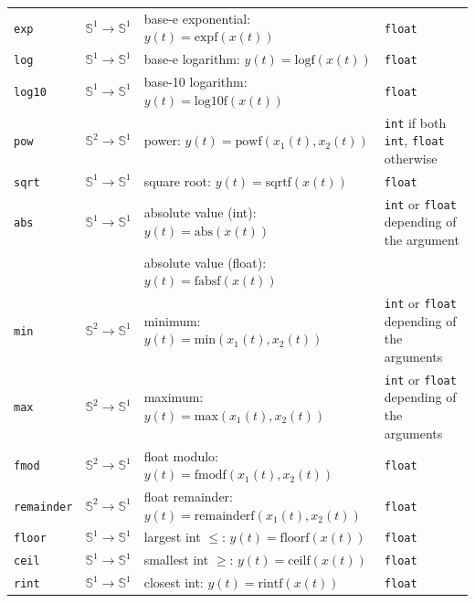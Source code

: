 \begin{tabular}{|l|l|l|l|}
\texttt{exp} & $\mathbb{S}^{1}\rightarrow\mathbb{S}^{1}$ & base-e exponential: $y(t)=\mathrm{expf}(x(t))$  & \texttt{float}\\
\texttt{log} & $\mathbb{S}^{1}\rightarrow\mathbb{S}^{1}$ & base-e logarithm: $y(t)=\mathrm{logf}(x(t))$  & \texttt{float}\\
\texttt{log10} & $\mathbb{S}^{1}\rightarrow\mathbb{S}^{1}$ & base-10 logarithm: $y(t)=\mathrm{log10f}(x(t))$ & \texttt{float} \\
\texttt{pow} & $\mathbb{S}^{2}\rightarrow\mathbb{S}^{1}$ & power: $y(t)=\mathrm{powf}(x_{1}(t),x_{2}(t))$ & \texttt{int} if both \texttt{int}, \texttt{float} otherwise \\
\texttt{sqrt} & $\mathbb{S}^{1}\rightarrow\mathbb{S}^{1}$ & square root: $y(t)=\mathrm{sqrtf}(x(t))$  & \texttt{float}\\
\texttt{abs} & $\mathbb{S}^{1}\rightarrow\mathbb{S}^{1}$ & absolute value (int): $y(t)=\mathrm{abs}(x(t))$ & \texttt{int} or \texttt{float} depending of the argument \\
			&											 & absolute value (float): $y(t)=\mathrm{fabsf}(x(t))$ \\
\texttt{min} & $\mathbb{S}^{2}\rightarrow\mathbb{S}^{1}$ & minimum: $y(t)=\mathrm{min}(x_{1}(t),x_{2}(t))$  &\texttt{int} or \texttt{float} depending of the arguments \\
\texttt{max} & $\mathbb{S}^{2}\rightarrow\mathbb{S}^{1}$ & maximum: $y(t)=\mathrm{max}(x_{1}(t),x_{2}(t))$  &\texttt{int} or \texttt{float} depending of the arguments \\
\texttt{fmod} & $\mathbb{S}^{2}\rightarrow\mathbb{S}^{1}$ & float modulo: $y(t)=\mathrm{fmodf}(x_{1}(t),x_{2}(t))$ & \texttt{float} \\
\texttt{remainder} & $\mathbb{S}^{2}\rightarrow\mathbb{S}^{1}$ & float remainder: $y(t)=\mathrm{remainderf}(x_{1}(t),x_{2}(t))$ & \texttt{float} \\

\texttt{floor} & $\mathbb{S}^{1}\rightarrow\mathbb{S}^{1}$ & largest int $\leq$: $y(t)=\mathrm{floorf}(x(t))$  & \texttt{float}\\
\texttt{ceil} & $\mathbb{S}^{1}\rightarrow\mathbb{S}^{1}$ & smallest int $\geq$: $y(t)=\mathrm{ceilf}(x(t))$  & \texttt{float}\\
\texttt{rint} & $\mathbb{S}^{1}\rightarrow\mathbb{S}^{1}$ & closest int: $y(t)=\mathrm{rintf}(x(t))$ & \texttt{float} \\



\hline
\end{tabular}
\bigskip

